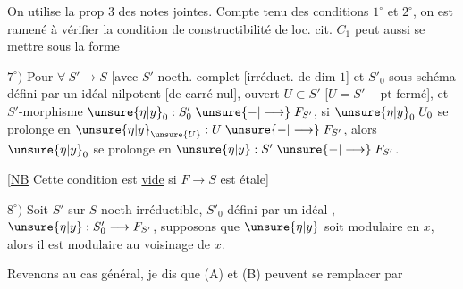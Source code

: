 On utilise la prop $3$ des notes jointes.
Compte tenu des conditions $1^\circ$ et $2^\circ$, on est ramené à vérifier la condition de constructibilité de loc. cit.
$C_1$ peut aussi se mettre sous la forme

$7^\circ)$ Pour $\forall\ S'\longrightarrow S$ [avec $S'$  noeth. \inserted{[local]} complet [irréduct. de dim $1$] et $S'_0$ sous-schéma défini par un idéal nilpotent [de carré nul],  ouvert $U\subset S'$  [$U=S'-\text{pt fermé}$], et  $S'$-morphisme $\unsure{\eta|y}_0:S'_0\mathrel{\unsure{-|\longrightarrow}}F_{S'}$,   si $\unsure{\eta|y}_0|U_0$ se prolonge en $\unsure{\eta|y}_{\unsure{U}}:U\mathrel{\unsure{-|\longrightarrow}}F_{S'}$, alors $\unsure{\eta|y}_0$ se prolonge en $\unsure{\eta|y}:S'\mathrel{\unsure{-|\longrightarrow}}F_{S'}$.

[\uline{NB} Cette condition est \uline{vide} si $F\longrightarrow S$ est étale]

$8^\circ)$ Soit $S'$ sur $S$ noeth irréductible,  $S'_0$ défini par un idéal , $\unsure{\eta|y}:S'_0\longrightarrow F_{S'}$, supposons que $\unsure{\eta|y}$ soit modulaire  en $x$, alors il est modulaire au voisinage de $x$.


Revenons au cas général,  je dis que (A) et (B) peuvent se remplacer par

